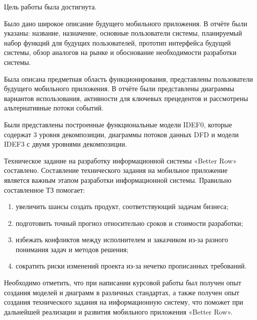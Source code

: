 \documentclass[14pt]{extreport}
\begin{document}
\conclusions

Цель работы была достигнута.

Было дано широкое описание будущего мобильного приложения. В отчёте были указаны: название, назначение, основные пользователи системы, планируемый набор функций для будущих пользователей, прототип интерфейса будущей системы, обзор аналогов на рынке и обоснование необходимости разработки системы.

Была описана предметная область функционирования, представлены пользователи будущего мобильного приложения. В отчёте были представлены диаграммы вариантов использования, активности для ключевых прецедентов и рассмотрены альтернативные потоки событий.

Были представлены построенные функциональные модели IDEF0, которые содержат 3 уровня декомпозиции,  диаграммы потоков данных DFD и модели IDEF3 с двумя уровнями декомпозиции.

Техническое задание на разработку информационной системы «Better Row» составлено. Составление технического задания на мобильное приложение является важным этапом разработки информационной системы. Правильно составленное ТЗ помогает:
\begin{enumerate}
\item увеличить шансы создать продукт, соответствующий задачам бизнеса;
\item подготовить точный прогноз относительно сроков и стоимости разработки;
\item избежать конфликтов между исполнителем и заказчиком из-за разного понимания задач и методов решения;
\item сократить риски изменений проекта из-за нечетко прописанных требований.
\end{enumerate}

Необходимо отметить, что при написании курсовой работы был получен опыт создания моделей и диаграмм в различных стандартах, а также получен опыт создания технического задания на информационную систему, что поможет при дальнейшей реализации и развития мобильного приложения «Better Row».
\end{document}
